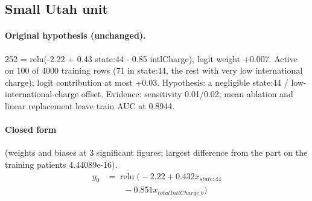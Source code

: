 \documentclass[a4paper,10pt]{article}
\newif\ifreviewmarks
\newcommand{\reviewrule}{\noindent{\color{BrickRed}\rule{\linewidth}{0.8pt}}}
\newenvironment{drafted}[1][]{%
  \ifreviewmarks\par\addvspace{\medskipamount}\reviewrule\par\nopagebreak
  \noindent{\color{BrickRed}\sffamily\footnotesize\textbf{Thesis Draft}\quad #1\hfill review}\par\nopagebreak\smallskip\fi}{%
  \ifreviewmarks\par\smallskip\noindent{\color{BrickRed}\sffamily\footnotesize end of thesis draft}\par\nopagebreak\reviewrule\par\medskip\fi}
\begin{document}
\begin{drafted}[plain-language layer: churn100-s2-c2]
\subsection{Small Utah unit}\label{tech:ann93}
\paragraph{Original hypothesis (unchanged).} 252 = relu(-2.22 + 0.43 state:44 - 0.85 intlCharge), logit weight +0.007. Active on 100 of 4000 training rows (71 in state:44, the rest with very low international charge); logit contribution at most +0.03. Hypothesis: a negligible state:44 / low-international-charge offset. Evidence: sensitivity 0.01/0.02; mean ablation and linear replacement leave train AUC at 0.8944.
\paragraph{Closed form} {\footnotesize(weights and biases at 3 significant figures; largest difference from the part on the training patients 4.44089e-16).}
{\small\begingroup\allowdisplaybreaks
\begin{align*}
y_{0} &= \operatorname{relu}\bigl(-2.22 + 0.432 x_{state:44} \\
&\qquad - 0.851 x_{totalIntlCharge\_b}\bigr)
\end{align*}\endgroup}


\end{drafted}
\end{document}
